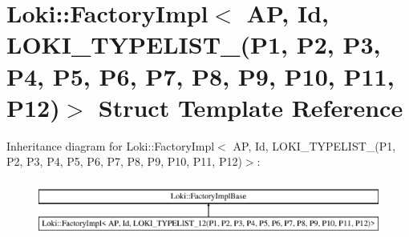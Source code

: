 \hypertarget{structLoki_1_1FactoryImpl_3_01AP_00_01Id_00_01LOKI__TYPELIST__12_07P1_00_01P2_00_01P3_00_01P4_00f13f17f8239845d239ca7a0cdddac4d0}{}\section{Loki\+:\+:Factory\+Impl$<$ A\+P, Id, L\+O\+K\+I\+\_\+\+T\+Y\+P\+E\+L\+I\+S\+T\+\_(P1, P2, P3, P4, P5, P6, P7, P8, P9, P10, P11, P12)$>$ Struct Template Reference}
\label{structLoki_1_1FactoryImpl_3_01AP_00_01Id_00_01LOKI__TYPELIST__12_07P1_00_01P2_00_01P3_00_01P4_00f13f17f8239845d239ca7a0cdddac4d0}
Inheritance diagram for Loki\+:\+:Factory\+Impl$<$ A\+P, Id, L\+O\+K\+I\+\_\+\+T\+Y\+P\+E\+L\+I\+S\+T\+\_(P1, P2, P3, P4, P5, P6, P7, P8, P9, P10, P11, P12)$>$\+:\begin{figure}[H]
\begin{center}
\leavevmode
\includegraphics[height=1.866667cm]{structLoki_1_1FactoryImpl_3_01AP_00_01Id_00_01LOKI__TYPELIST__12_07P1_00_01P2_00_01P3_00_01P4_00f13f17f8239845d239ca7a0cdddac4d0}
\end{center}
\end{figure}
